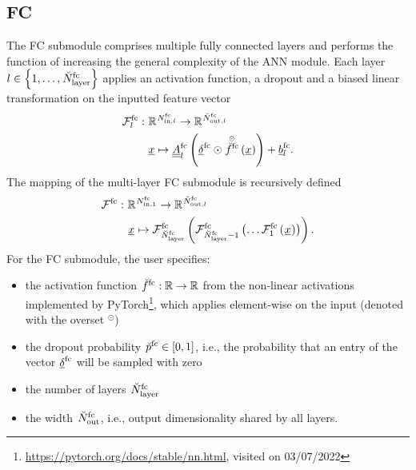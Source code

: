 \subsection*{FC}
The FC submodule comprises multiple fully connected layers
and performs the function
of increasing the general complexity of the ANN module.
Each layer 
$
    l 
    \in 
    \left\{
        1, \dots, \num[\user]{\fc}{\layer}{}{}
    \right\}
$ 
applies
an activation function,
a dropout
and a biased linear transformation
on the inputted feature vector
\begin{align} \label{eq:fc_layer}
    \mathcal{F}^\text{fc}_l
    :\ &
    \mathbb{R}^{
        \num[]{\text{fc}}{\text{in}, l}{}{}
    }
    \rightarrow 
    \mathbb{R}^{
        \num[\user]{\text{fc}}{\text{out}, l}{}{}
        }
    \nonumber \\ &
    \underline{x}
    \mapsto
    \underline{\underline A}^\text{fc}_l
    \left(
        \underline{\delta}^\text{fc}
        \odot
        \overset{\scriptscriptstyle \odot}{\func[\user]{\fc}{}{}{}} \left(
            \underline{x}
        \right)
    \right)
    + \underline b^\text{fc}_l
    .
\end{align}
The mapping of the multi-layer FC submodule is recursively defined
\begin{align} \label{eq:fc}
    \mathcal{F}^\text{fc}
    :\ &
    \mathbb{R}^{
        \num[]{\text{fc}}{\text{in}, 1}{}{}
    }
    \rightarrow 
    \mathbb{R}^{
        \num[\user]{\text{fc}}{\text{out}, l}{}{}
        }
    \nonumber \\ &
    \featvec[]{}{}{}{}
    \mapsto
    \mathcal{F}^\text{fc}_{\num[\user]{\fc}{\layer}{}{}} \left(
        \mathcal{F}^\text{fc}_{\num[\user]{\fc}{\layer}{}{} - 1} \left(
            \dots
            \mathcal{F}^\text{fc}_{1} \left(
                \featvec[]{}{}{}{}
            \right)    
        \right)
    \right)
    .
\end{align}
For the FC submodule,
the user specifies:
\begin{itemize}
    \item the activation function
    $\func[\user]{\fc}{}{}{}: \mathbb{R} \rightarrow \mathbb{R} $
    from the non-linear activations
    implemented by PyTorch\footnote{
        \url{https://pytorch.org/docs/stable/nn.html}, visited on 03/07/2022
    },
    which applies element-wise 
    on the input (denoted with the overset ${}^\odot$)
    \item the dropout probability 
    $\prob[\user]{\fc}{}{}{} \in [0,1]$,
    i.e., the probability that an entry of the vector 
    $\underline{\delta}^\fc$ will be sampled with zero
    \item the number of layers
    $
    \num[\user]{\fc}{\layer}{}{}
    $
    \item the width 
    $
    \num[\user]{\fc}{\outp}{}{}
    $,
    i.e., output dimensionality
    shared by all layers.
\end{itemize}
